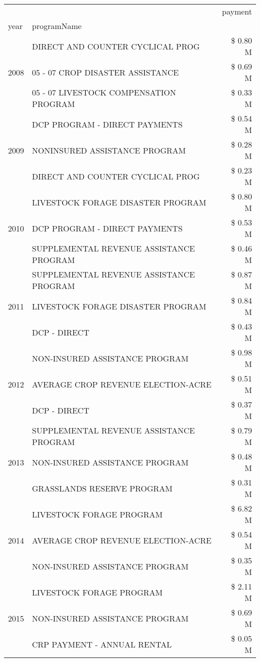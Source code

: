 \begin{tabular}{llr}
\toprule
 &  & payment \\
year & programName &  \\
\midrule
\multirow[t]{3}{*}{2008} & DIRECT AND COUNTER CYCLICAL PROG & \$ 0.80 M \\
 & 05 - 07 CROP DISASTER ASSISTANCE & \$ 0.69 M \\
 & 05 - 07 LIVESTOCK COMPENSATION PROGRAM & \$ 0.33 M \\
\cline{1-3}
\multirow[t]{3}{*}{2009} & DCP PROGRAM - DIRECT PAYMENTS & \$ 0.54 M \\
 & NONINSURED ASSISTANCE PROGRAM & \$ 0.28 M \\
 & DIRECT AND COUNTER CYCLICAL PROG & \$ 0.23 M \\
\cline{1-3}
\multirow[t]{3}{*}{2010} & LIVESTOCK FORAGE DISASTER  PROGRAM & \$ 0.80 M \\
 & DCP PROGRAM - DIRECT PAYMENTS & \$ 0.53 M \\
 & SUPPLEMENTAL REVENUE ASSISTANCE PROGRAM & \$ 0.46 M \\
\cline{1-3}
\multirow[t]{3}{*}{2011} & SUPPLEMENTAL REVENUE ASSISTANCE PROGRAM & \$ 0.87 M \\
 & LIVESTOCK FORAGE DISASTER PROGRAM & \$ 0.84 M \\
 & DCP - DIRECT & \$ 0.43 M \\
\cline{1-3}
\multirow[t]{3}{*}{2012} & NON-INSURED ASSISTANCE PROGRAM & \$ 0.98 M \\
 & AVERAGE CROP REVENUE ELECTION-ACRE & \$ 0.51 M \\
 & DCP - DIRECT & \$ 0.37 M \\
\cline{1-3}
\multirow[t]{3}{*}{2013} & SUPPLEMENTAL REVENUE ASSISTANCE PROGRAM & \$ 0.79 M \\
 & NON-INSURED ASSISTANCE PROGRAM & \$ 0.48 M \\
 & GRASSLANDS RESERVE PROGRAM & \$ 0.31 M \\
\cline{1-3}
\multirow[t]{3}{*}{2014} & LIVESTOCK FORAGE PROGRAM & \$ 6.82 M \\
 & AVERAGE CROP REVENUE ELECTION-ACRE & \$ 0.54 M \\
 & NON-INSURED ASSISTANCE PROGRAM & \$ 0.35 M \\
\cline{1-3}
\multirow[t]{3}{*}{2015} & LIVESTOCK FORAGE PROGRAM & \$ 2.11 M \\
 & NON-INSURED ASSISTANCE PROGRAM & \$ 0.69 M \\
 & CRP PAYMENT - ANNUAL RENTAL & \$ 0.05 M \\

\end{tabular}
